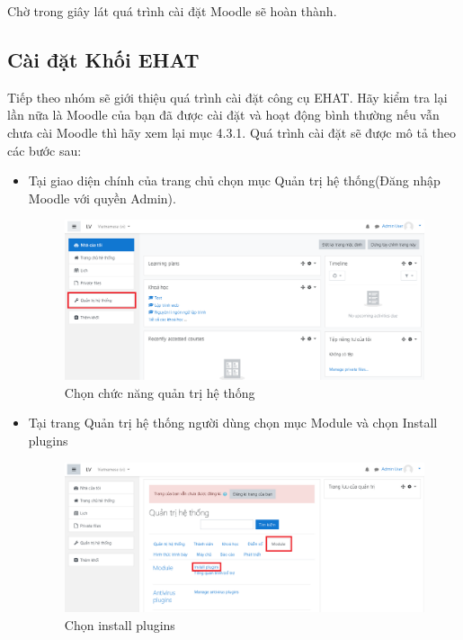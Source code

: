 \vskip 7cm
Chờ trong giây lát quá trình cài đặt Moodle sẽ hoàn thành.

\subsection*{Cài đặt Khối EHAT}
Tiếp theo nhóm sẽ giới thiệu quá trình cài đặt công cụ EHAT. Hãy kiểm tra lại lần nữa là Moodle của bạn đã được cài đặt và hoạt động bình thường nếu vẫn chưa cài Moodle thì hãy xem lại mục 4.3.1. Quá trình cài đặt sẽ được mô tả theo các bước sau:

\begin{itemize}
	\item Tại giao diện chính của trang chủ chọn mục Quản trị hệ thống(Đăng nhập Moodle với quyền Admin).
	
	\begin{center}
		\begin{figure}[htp]
			\begin{center}
				\includegraphics[width=1\linewidth]{img/6}
			\end{center}
			\caption{Chọn chức năng quản trị hệ thống}
			\label{refhinh36}
		\end{figure}
	\end{center}
	
	\item Tại trang Quản trị hệ thống người dùng chọn mục Module và chọn Install plugins
	
	\begin{center}
		\begin{figure}[htp]
			\begin{center}
				\includegraphics[width=1\linewidth]{img/7}
			\end{center}
			\caption{Chọn install plugins}
			\label{refhinh37}
		\end{figure}
	\end{center}
	

\end{itemize}
